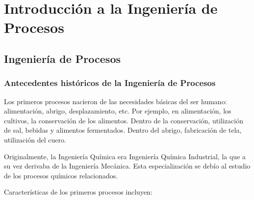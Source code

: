 %
%


\section{Introducción a la Ingeniería de Procesos}

    \subsection{Ingeniería de Procesos}
    
        \subsubsection{Antecedentes históricos de la Ingeniería de Procesos}
        
        Los primeros procesos nacieron de las necesidades básicas del ser humano: alimentación, abrigo, desplazamiento, etc. Por ejemplo, en alimentación, los cultivos, la conservación de los alimentos. Dentro de la conservación, utilización de sal, bebidas y alimentos fermentados. Dentro del abrigo, fabricación de tela, utilización del cuero.
        
        Originalmente, la Ingeniería Química era Ingeniería Química Industrial, la que a su vez derivaba de la Ingeniería Mecánica. Esta especialización se debío al estudio de los procesos químicos relacionados.
        
        Características de los primeros procesos incluyen:
        
